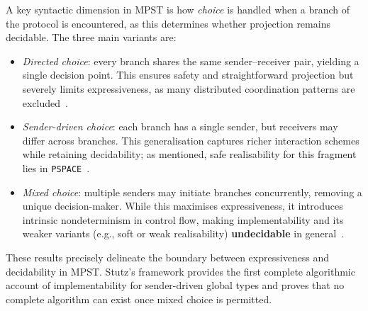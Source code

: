 A key syntactic dimension in MPST is how \emph{choice} is handled 
when a branch of the protocol is encountered, as this 
determines whether projection remains decidable.  
The three main variants are:
\begin{itemize}
    \item \emph{Directed choice}: every branch shares the same 
    sender–receiver pair, yielding a single decision point.  
    This ensures safety and straightforward projection but severely limits 
    expressiveness, as many distributed coordination patterns are 
    excluded~\cite{honda2008multiparty}.  

    \item \emph{Sender-driven choice}: each branch has a single sender, 
    but receivers may differ across branches.  
    This generalisation captures richer interaction schemes while retaining 
    decidability; as mentioned, safe realisability for this fragment lies in 
    \verb|PSPACE|~\cite{stutz2024implementability}.  

    \item \emph{Mixed choice}: multiple senders may initiate branches 
    concurrently, removing a unique decision-maker.  
    While this maximises expressiveness, it introduces intrinsic 
    nondeterminism in control flow, making implementability and its 
    weaker variants (e.g., soft or weak realisability) \textbf{undecidable} 
    in general~\cite{stutz2024implementability}.  
\end{itemize}

These results precisely delineate the boundary between expressiveness and 
decidability in MPST.  
Stutz’s framework provides the first complete algorithmic account of 
implementability for sender-driven global types and proves that no 
complete algorithm can exist once mixed choice is permitted.


